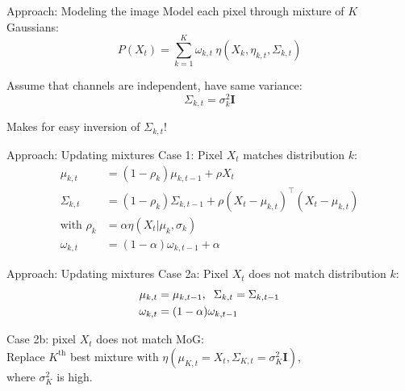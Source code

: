 \documentclass{beamer}
\begin{document}
\begin{frame}{Approach: Modeling the image}
Model each pixel through mixture of $K$ Gaussians:
\begin{equation*}
P(X_t) = \sum^K_{k=1} \omega_{k,t}~\eta
	(X_k, \eta_{k, t}, \Sigma_{k,t})
\end{equation*} %

Assume that channels are independent, have same variance:
\begin{equation*}
\Sigma_{k,t} = \sigma_k^2 \textbf{I}
\end{equation*}

Makes for easy inversion of $\Sigma_{k,t}$! %
\end{frame}

\begin{frame}{Approach: Updating mixtures}
Case 1: Pixel $X_t$ matches distribution $k$: \vspace{-3mm}
\begin{align*}
  \mu_{k,t} &= (1 - \rho_k) \mu_{k, t-1} + \rho X_t \\
  \Sigma_{k,t} &= (1 - \rho_k) \Sigma_{k,t-1} + \rho (X_t - \mu_{k,t})^\top (X_t - \mu_{k,t}) \\
\text{with }  \rho_k &= \alpha \eta(X_t | \mu_k , \sigma_k) \\
\omega_{k,t} &= (1-\alpha) \omega_{k,t-1} + \alpha 
\end{align*}
\end{frame}

\begin{frame}{Approach: Updating mixtures}
Case 2a: Pixel $X_t$ does not match distribution $k$: \vspace{-3mm}
\begin{align*}
  \mu_{k,t} &= \mu_{k, t-1} , \hspace{2mm} \Sigma_{k,t} =  \Sigma_{k,t-1} \\
\omega_{k,t} &= (1-\alpha) \omega_{k,t-1}
\end{align*}

Case 2b: pixel $X_t$ does not match MoG: \\
      \hspace{1cm} Replace $K^{\text{th}}$ best mixture with $\eta(\mu_{K,t}=X_t, \Sigma_{K,t}=\sigma^2_{K} \textbf{I})$, \\
      \hspace{1cm} where $\sigma^2_K$ is high.
\end{frame}
\end{document}
